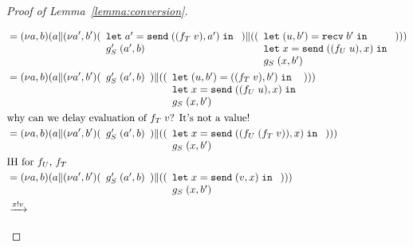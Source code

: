 \begin{proof}[Proof of Lemma~\ref{lemma:conversion}]
\begin{enumerate}
\begin{itemize}
\begin{align*}
        &= \PScope ({\PPar {a} {\PScope[a',b'] \PPar {(
          \begin{array}[t]{l}
        \ELet {a'} {\ESend {(f_T \; v)} {a'}} \\
          g'_S \; (a', b)
          \end{array}
        )} {({ (
        \begin{array}[t]{l}
          \ELetP {u} {b'} {\ERecv{b'}} \\
        \ELet {x} {\ESend {(f_U \; u)} {x}}  \\
        g_S \; (x, b')
        \end{array}
        ) })}}})  \\
        &= \PScope ({\PPar {a} {\PScope[a',b'] \PPar {(
          \begin{array}[t]{l}
          g'_S \; (a', b)
          \end{array}
        )} {({ (
        \begin{array}[t]{l}
          \ELetP {u} {b'} {((f_T \; v), b')} \\
        \ELet {x} {\ESend {(f_U \; u)} {x}}  \\
        g_S \; (x, b')
        \end{array}
        ) })}}})  \\
        & \text{why can we delay evaluation of $f_T\;v$? It's not a value!} \\
        &= \PScope ({\PPar {a} {\PScope[a',b'] \PPar {(
          \begin{array}[t]{l}
          g'_S \; (a', b)
          \end{array}
        )} {({ (
        \begin{array}[t]{l}
        \ELet {x} {\ESend {(f_U \; (f_T \; v))} {x}}  \\
        g_S \; (x, b')
        \end{array}
        ) })}}})  \\
        & \text{IH for $f_U$, $f_T$} \\
        &= \PScope ({\PPar {a} {\PScope[a',b'] \PPar {(
          \begin{array}[t]{l}
          g'_S \; (a', b)
          \end{array}
        )} {({ (
        \begin{array}[t]{l}
        \ELet {x} {\ESend {v} {x}}  \\
        g_S \; (x, b')
        \end{array}
        ) })}}})  \\
        & \reduce[x!v]{}

\end{align*}
\end{itemize}
\end{enumerate}
\end{proof}
